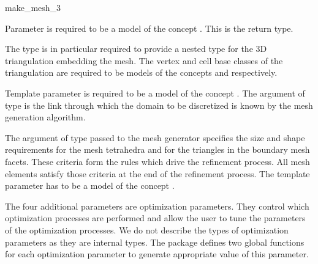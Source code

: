 \begin{ccRefFunction}{make_mesh_3}
\ccParameters

Parameter  is required to be a model of
the concept 
. This is the return type.

The type  is in particular required to provide a nested type
 for the 3D triangulation
embedding the mesh. The vertex and cell base classes of the
triangulation  are required to be models of the
concepts  and 
respectively.

Template parameter  is required to be a model of
the concept  . The argument  of type
 is the link through which the domain
to be discretized is known  by the mesh generation algorithm. 



The argument of
type  passed to the mesh generator specifies the
size and shape requirements for the mesh tetrahedra
and for the triangles in the boundary mesh facets. These criteria
form the rules which drive the refinement process. All mesh elements
satisfy those criteria at the end of the refinement process.
The template parameter  has to be a model of the concept
. 


The four additional parameters are optimization parameters.
They control which optimization processes are performed
and allow the user to tune the parameters of the optimization processes.
We do not describe  the types of optimization parameters  as they are
internal types. The package defines two global
functions for each optimization parameter
 to generate appropriate value of this parameter.


\end{ccRefFunction}
